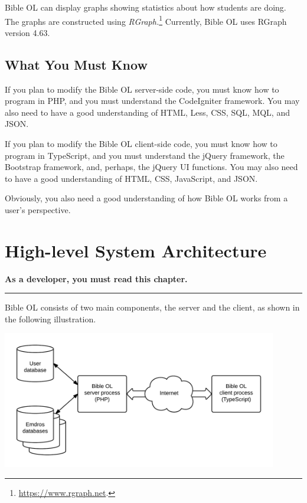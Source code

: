 \documentclass[11pt,oneside,a4paper]{memoir}
\begin{document}
Bible OL can display graphs showing statistics about how students are doing. The graphs are
constructed using \emph{RGraph.}\footnote{\url{https://www.rgraph.net}.} Currently, Bible OL uses
RGraph version 4.63.


\section{What You Must Know}

If you plan to modify the Bible OL server-side code, you must know how to program in PHP, and you
must understand the CodeIgniter framework. You may also need to have a good understanding of HTML,
Less, CSS, SQL, MQL, and JSON.

If you plan to modify the Bible OL client-side code, you must know how to program in TypeScript, and
you must understand the jQuery framework, the Bootstrap framework, and, perhaps, the jQuery UI
functions. You may also need to have a good understanding of HTML, CSS, JavaScript, and JSON.

Obviously, you also need a good understanding of how Bible OL works from a user's perspective.


\chapter{High-level System Architecture}

\textbf{As a developer, you must read this chapter.}

\plainbreak{3}

Bible OL consists of two main components, the server and the
client, as shown in the following illustration.

\begin{center}
  \includegraphics[width=0.9\textwidth]{BOL_overview.png}
\end{center}
\end{document}
